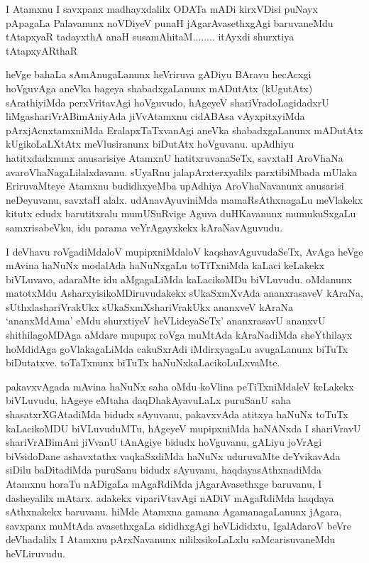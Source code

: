 \begin{artha}
I Atamxnu I savxpanx madhayxdalilx ODATa mADi kirxVDisi puNayx pApagaLa Palavanunx noVDiyeV punaH jAgarAvasethxgAgi baruvaneMdu tAtapxyaR tadayxthA anaH susamAhitaM........ itAyxdi shurxtiya tAtapxyARthaR
\end{artha}


\begin{artha}
heVge bahaLa sAmAnugaLanunx heVriruva gADiyu BAravu hecAcxgi hoVguvAga aneVka bageya shabadxgaLanunx mADutAtx (kUgutAtx) sArathiyiMda perxVritavAgi hoVguvudo, hAgeyeV shariVradoLagidadxrU liMgashariVrABimAniyAda jiVvAtamxnu cidABAsa vAyxpitxyiMda pArxjAcnxtamxniMda EralapxTaTxvanAgi aneVka shabadxgaLanunx mADutAtx kUgikoLaLXtAtx meVlusiranunx biDutAtx hoVguvanu. upAdhiyu hatitxdadxnunx anusarisiye AtamxnU hatitxruvanaSeTx, savxtaH AroVhaNa avaroVhaNagaLilalxdavanu. sUyaRnu jalapArxterxyalilx parxtibiMbada mUlaka EriruvaMteye Atamxnu budidhxyeMba upAdhiya AroVhaNavanunx anusarisi neDeyuvanu, savxtaH alalx. udAnavAyuviniMda mamaRsAthxnagaLu meVlakekx kitutx edudx barutitxralu mumUSuRvige Aguva duHKavanunx mumukuSxgaLu samxrisabeVku, idu parama veYrAgayxkekx kAraNavAguvudu.  
\end{artha}


\begin{artha}
I deVhavu roVgadiMdaloV mupipxniMdaloV kaqshavAguvudaSeTx, AvAga heVge mAvina haNuNx modalAda haNuNxgaLu toTiTxniMda kaLaci keLakekx biVLuvavo, adaraMte idu aMgagaLiMda kaLacikoMDu biVLuvudu. oMdanunx matotxMdu AsharxyisikoMDiruvudakekx sUkaSxmXvAda ananxrasaveV kAraNa, sUthxlashariVrakUkx sUkaSxmXshariVrakUkx ananxveV kAraNa `ananxMdAma' eMdu shurxtiyeV heVLideyaSeTx' ananxrasavU ananxvU shithilagoMDAga aMdare mupupx roVga muMtAda kAraNadiMda sheYthilayx hoMdidAga goVlakagaLiMda cakuSxrAdi iMdirxyagaLu avugaLanunx biTuTx biDutatxve. toTaTxnunx biTuTx haNuNxkaLacikoLuLxvaMte. 
\end{artha}%

\begin{artha}
pakavxvAgada mAvina haNuNx saha oMdu koVlina peTiTxniMdaleV keLakekx biVLuvudu, hAgeye eMtaha daqDhakAyavuLaLx puruSanU saha shasatxrXGAtadiMda bidudx sAyuvanu, pakavxvAda atitxya haNuNx toTuTx kaLacikoMDU biVLuvuduMTu, hAgeyeV mupipxniMda haNANxda I shariVravU shariVrABimAni jiVvanU tAnAgiye bidudx hoVguvanu, gALiyu joVrAgi biVsidoDane ashavxtathx vaqkaSxdiMda haNuNx uduruvaMte deYvikavAda siDilu baDitadiMda puruSanu bidudx sAyuvanu, haqdayasAthxnadiMda Atamxnu horaTu nADigaLa mAgaRdiMda jAgarAvasethxge baruvanu, I dasheyalilx mAtarx. adakekx vipariVtavAgi nADiV mAgaRdiMda haqdaya sAthxnakekx baruvanu. hiMde Atamxna gamana AgamanagaLanunx jAgara, savxpanx muMtAda avasethxgaLa sididhxgAgi heVLididxtu, IgalAdaroV beVre deVhadalilx I Atamxnu pArxNavanunx nililxsikoLaLxlu saMcarisuvaneMdu heVLiruvudu.
\end{artha}

